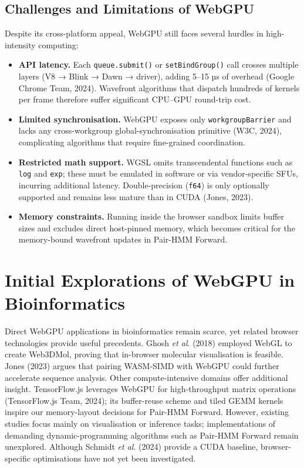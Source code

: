 \documentclass[PhD]{PHlab-thesis}
\begin{document}
\subsection{Challenges and Limitations of WebGPU}
Despite its cross-platform appeal, WebGPU still faces several hurdles in high-intensity computing:

\begin{itemize}
  \item \textbf{API latency.} Each \verb|queue.submit()| or \verb|setBindGroup()| call crosses multiple layers (V8 → Blink → Dawn → driver), adding 5–15 µs of overhead (Google Chrome Team, 2024). Wavefront algorithms that dispatch hundreds of kernels per frame therefore suffer significant CPU–GPU round-trip cost.
  \item \textbf{Limited synchronisation.} WebGPU exposes only \verb|workgroupBarrier| and lacks any cross-workgroup global-synchronisation primitive (W3C, 2024), complicating algorithms that require fine-grained coordination.
  \item \textbf{Restricted math support.} WGSL omits transcendental functions such as \verb|log| and \verb|exp|; these must be emulated in software or via vendor-specific SFUs, incurring additional latency. Double-precision (\texttt{f64}) is only optionally supported and remains less mature than in CUDA (Jones, 2023).
  \item \textbf{Memory constraints.} Running inside the browser sandbox limits buffer sizes and excludes direct host-pinned memory, which becomes critical for the memory-bound wavefront updates in Pair-HMM Forward.
\end{itemize}


\section{Initial Explorations of WebGPU in Bioinformatics}
Direct WebGPU applications in bioinformatics remain scarce, yet related browser technologies provide useful precedents. Ghosh \emph{et al}. (2018) employed WebGL to create Web3DMol, proving that in-browser molecular visualisation is feasible. Jones (2023) argues that pairing WASM-SIMD with WebGPU could further accelerate sequence analysis.  
Other compute-intensive domains offer additional insight. TensorFlow.js leverages WebGPU for high-throughput matrix operations (TensorFlow.js Team, 2024); its buffer-reuse scheme and tiled GEMM kernels inspire our memory-layout decisions for Pair-HMM Forward. However, existing studies focus mainly on visualisation or inference tasks; implementations of demanding dynamic-programming algorithms such as Pair-HMM Forward remain unexplored. Although Schmidt \emph{et al}. (2024) provide a CUDA baseline, browser-specific optimisations have not yet been investigated.
\end{document}
